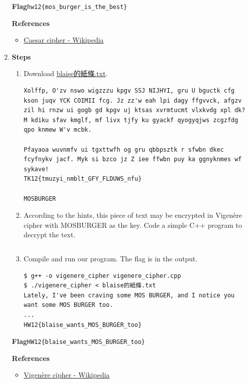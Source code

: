 \documentclass[12pt, a4paper]{article}
\begin{document}
\begin{enumerate}[label=(\alph*)]
    \textbf{Flag}\quad\verb|hw12{mos_burger_is_the_best}|

    \textbf{References}
    \begin{itemize}
      \item \href{https://en.wikipedia.org/wiki/Caesar_cipher}{Caesar cipher - Wikipedia}
    \end{itemize}

    \pagebreak
    \item \textbf{Steps}
    \begin{enumerate}
      \item Download \href{https://drive.google.com/file/d/1KB4m0cUQopZ0h09-Nr7RwOD2-HhccwVf/view?usp=drive_link}{blaise的紙條.txt}.
      \begin{Verbatim}[frame=single, fontsize=\scriptsize, breaklines]
Xolffp, O'zv nswo wigzzzu kpgv SSJ NIJHYI, gru U bguctk cfg kson juqv YCK COIMII fcg. Jz zz'w eah lpi dagy ffgvvck, afgzv zil hi rnzw ui gogb gd kpgv uj ktsas xvrmtucmt vlxkvdg xpl dk? M kdiku sfav kmglf, mf livx tjfy ku gyackf qyogyqjws zcgzfdg qpo knmew W'v mcbk.

Pfayaoa wuvnmfv ui tgxttwfh og gru qbbpsztk r sfwbn dkec fcyfnykv jacf. Myk si bzco jz Z iee ffwbn puy ka ggnyknmes wf sykave!
TK12{tmuzyi_nmblt_GFY_FLDUWS_nfu}

MOSBURGER
      \end{Verbatim}
      \item According to the hints, this piece of text may be encrypted in Vigenère cipher
      with MOSBURGER as the key. Code a simple C++ program to decrypt the text.
      \inputminted[fontsize=\small]{cpp}{1-c/vigenere_cipher.cpp}
      \item Compile and run our program. The flag is in the output.
      \begin{Verbatim}[frame=single, fontsize=\small, breaklines]
$ g++ -o vigenere_cipher vigenere_cipher.cpp
$ ./vigenere_cipher < blaise的紙條.txt
Lately, I've been craving some MOS BURGER, and I notice you want some MOS BURGER too.
...
HW12{blaise_wants_MOS_BURGER_too}
      \end{Verbatim}
    \end{enumerate}

    \textbf{Flag}\quad\verb|HW12{blaise_wants_MOS_BURGER_too}|

    \textbf{References}
    \begin{itemize}
      \item \href{https://en.wikipedia.org/wiki/Vigen%C3%A8re_cipher}{Vigenère cipher - Wikipedia}
    \end{itemize}


\end{enumerate}
\end{document}
